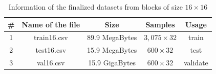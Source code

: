 \begin{table}[H]
    \caption{Information of the finalized datasets from blocks of size \(16\times16\)}
    \bigskip\label{tab:finalized-sixteen-by-sixteen}
    \centering
    \begin{tabular}{c c c c c}
        \toprule
        \# & Name of the file & Size & Samples & Usage\\
        \midrule
        1 & train16.csv & 89.9 MegaBytes & \(3,075\times32\) & train\\
        2 & test16.csv & 15.9 MegaBytes & \(600\times32\) & test\\
        3 & val16.csv & 15.9 GigaBytes & \(600\times32\) & validate\\
        \bottomrule
    \end{tabular}
\end{table}

